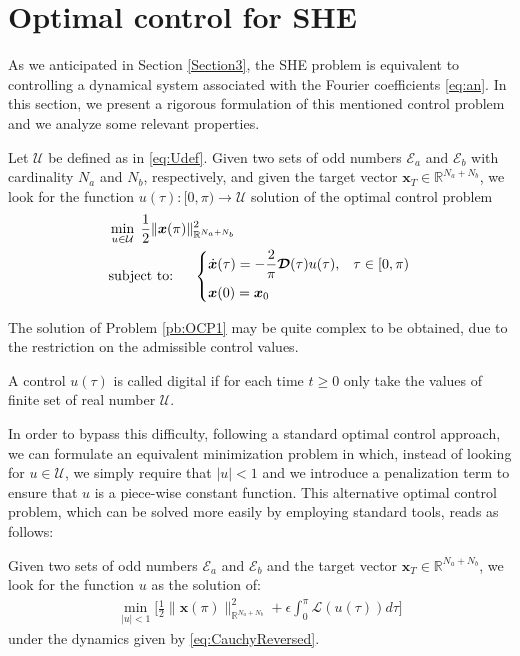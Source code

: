 \section{Optimal control for SHE}\label{Section4}

As we anticipated in Section \ref{Section3}, the SHE problem is equivalent to controlling a dynamical system associated with the Fourier coefficients \eqref{eq:an}. In this section, we present a rigorous formulation of this mentioned control problem and we analyze some relevant properties. 
\newline


\begin{problem}\label{pb:OCP1}
Let $\mathcal U$ be defined as in \eqref{eq:Udef}. Given two sets of odd numbers $\mathcal {E}_a $ and $\mathcal {E}_b $ with cardinality $N_a$ and $N_b$, respectively, and given the target vector $\bm{x}_T\in \mathbb{R}^{N_a+N_b}$, we look for the function $u(\tau):[0,\pi)\to \mathcal U$ solution of the optimal control problem  
\begin{align*}
	&\min_{u \in \mathcal{U}}\;\frac 12 \|\bm{x}(\pi)\|^2_{\mathbb{R}^{N_a+N_b}}
	\\
    &\notag \text{subject to: }\quad \begin{cases}
            \displaystyle \dot{\bm{x}}(\tau) = -\frac 2\pi\bm{\mathcal{D}}(\tau) u(\tau),  & \tau \in [0,\pi)\\[6pt]
            \bm{x}(0) = \bm{x}_0
    \end{cases}
    \end{align*}
\end{problem}
The solution of Problem \ref{pb:OCP1} may be quite complex to be obtained, due to the restriction on the admissible control values. 


\begin{definition}
    A control $u(\tau)$  is called digital if for each time $t\geq 0$ only take the values of finite set of real number $\mathcal{U}$.  
\end{definition}



In order to bypass this difficulty, following a standard optimal control approach, we can formulate an equivalent minimization problem in which, instead of looking for $u\in\mathcal U$, we simply require that $|u|<1$ and we introduce a penalization term to ensure that $u$ is a piece-wise constant function. This alternative optimal control problem, which can be solved more easily by employing standard tools, reads as follows:
\newline
\begin{problem}\label{pb:OCP2}
Given two sets of odd numbers $\mathcal E_a $ and $\mathcal E_b $ and the target vector $\bm{x}_T \in \mathbb {R}^{N_a + N_b}$, we look for the  function $u$ as the solution of:
\begin{align*}
	\min_{|u|<1} \Bigg[\frac 12 \|\bm{x}(\pi)\|^2_{\mathbb{R}^{N_a+N_b}} + \epsilon \int_0^{\pi} \mathcal{L}(u(\tau)) d\tau \Bigg]  
\end{align*}
under the dynamics given by \eqref{eq:CauchyReversed}.
\end{problem}

